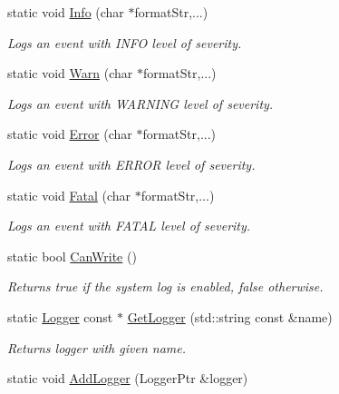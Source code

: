 \begin{DoxyCompactItemize}
static void \hyperlink{class_common_1_1_syslog_ae6c3ad265f135a9452d21719cbd51466}{Info} (char $\ast$format\-Str,...)
\begin{DoxyCompactList}\small\item\em Logs an event with I\-N\-F\-O level of severity. \end{DoxyCompactList}\item 
static void \hyperlink{class_common_1_1_syslog_a285653cc678ea3dc91963c5a686170e5}{Warn} (char $\ast$format\-Str,...)
\begin{DoxyCompactList}\small\item\em Logs an event with W\-A\-R\-N\-I\-N\-G level of severity. \end{DoxyCompactList}\item 
static void \hyperlink{class_common_1_1_syslog_aeb8b4ab02edb5f930c7feba4643ca217}{Error} (char $\ast$format\-Str,...)
\begin{DoxyCompactList}\small\item\em Logs an event with E\-R\-R\-O\-R level of severity. \end{DoxyCompactList}\item 
static void \hyperlink{class_common_1_1_syslog_ab80364a8cc256a412e9de63657d65fb1}{Fatal} (char $\ast$format\-Str,...)
\begin{DoxyCompactList}\small\item\em Logs an event with F\-A\-T\-A\-L level of severity. \end{DoxyCompactList}\item 
\hypertarget{class_common_1_1_syslog_ad4403cf7343af48bb04ea58cdff957b5}{static bool \hyperlink{class_common_1_1_syslog_ad4403cf7343af48bb04ea58cdff957b5}{Can\-Write} ()}\label{class_common_1_1_syslog_ad4403cf7343af48bb04ea58cdff957b5}

\begin{DoxyCompactList}\small\item\em Returns true if the system log is enabled, false otherwise. \end{DoxyCompactList}\item 
\hypertarget{class_common_1_1_syslog_a2e60380d49a6e177517496b15ba7a852}{static \hyperlink{class_common_1_1_logger}{Logger} const $\ast$ \hyperlink{class_common_1_1_syslog_a2e60380d49a6e177517496b15ba7a852}{Get\-Logger} (std\-::string const \&name)}\label{class_common_1_1_syslog_a2e60380d49a6e177517496b15ba7a852}

\begin{DoxyCompactList}\small\item\em Returns logger with given name. \end{DoxyCompactList}\item 
\hypertarget{class_common_1_1_syslog_ade49c3c9ecc8a7bad964d8a7685c2c19}{static void \hyperlink{class_common_1_1_syslog_ade49c3c9ecc8a7bad964d8a7685c2c19}{Add\-Logger} (Logger\-Ptr \&logger)}\label{class_common_1_1_syslog_ade49c3c9ecc8a7bad964d8a7685c2c19}


\end{DoxyCompactItemize}
